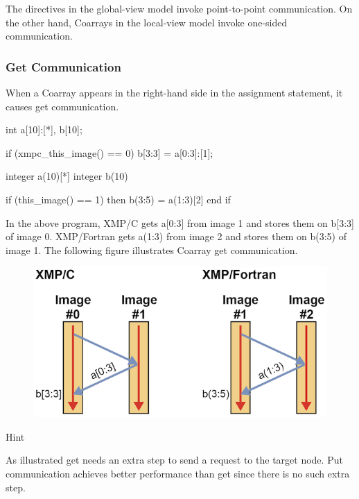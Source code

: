 \begin{mynote}
The directives in the global-view model invoke
point-to-point
communication. On the other hand, Coarrays in the local-view model
invoke one-sided communication.
\end{mynote}

\subsubsection{Get Communication}

When a Coarray appears in the right-hand side in the assignment
statement, it causes get communication.

\begin{XCexample}
int a[10]:[*], b[10];

if (xmpc_this_image() == 0)
  b[3:3] = a[0:3]:[1];
\end{XCexample}

\begin{XFexample}
integer a(10)[*]
integer b(10)

if (this_image() == 1) then
  b(3:5) = a(1:3)[2]
end if
\end{XFexample}

In the above program, XMP/C gets a[0:3] from image 1 and stores them on
b[3:3] of image 0. XMP/Fortran gets a(1:3) from image 2 and stores them
on b(3:5) of image 1. The following figure illustrates Coarray get
communication.

\begin{figure}
  \centering
  \includegraphics{figs/get.png}
\end{figure}

Hint

As illustrated get needs an extra step to send a request to the target
node. Put communication achieves better performance than get since there
is no such extra step.

